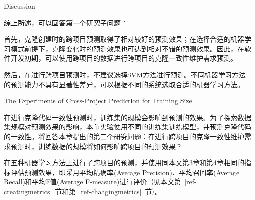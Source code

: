 
{Discussion}

综上所述，可以回答第一个研究子问题：

首先，克隆创建时的跨项目预测取得了相对较好的预测效果；在选择合适的机器学习模式前提下，克隆变化时的预测效果也可达到相对不错的预测效果。因此，在软件开发初期，可以使用跨项目的数据进行跨项目的克隆一致性维护需求预测。

然后，在进行跨项目预测时，不建议选择SVM方法进行预测。不同机器学习方法的预测能力不具有显著性差异，可以根据不同的系统选取合适的机器学习方法。


{The Experiments of Cross-Project Prediction for Training Size}

在进行克隆代码一致性预测时，训练集的规模会影响到预测的效果。为了探索数据集规模对预测效果的影响，本节实验使用不同的训练集训练模型，并预测克隆代码的一致性。将回答本章提出的第二个研究问题：在进行跨项目的克隆一致性维护需求预测时，训练数据的规模将如何影响跨项目的预测效果？

在五种机器学习方法上进行了跨项目的预测，并使用同本文第3章和第4章相同的指标评估预测效果，即采用平均精确率(Average Precision)、平均召回率(Average Recall)和平均F值(Average F-measure)进行评价（见本文第~\ref{ref-creatingmetrics}~节和第~\ref{ref-changingmetrics}~节）。

